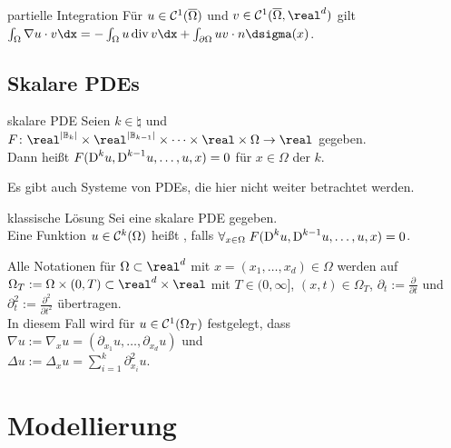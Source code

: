 \begin{Satz}{partielle Integration}
    Für $u \in \mathcal{C}^1(\overline{\Omega})$ und $v \in \C^1(\overline{\Omega}, \real^d)$ gilt\\
    $\int_\Omega \nabla u \cdot v \dx = -\int_\Omega u \div v \dx +
    \int_{\partial\Omega} uv \cdot n \dsigma(x)$.
\end{Satz}

\subsection{%
    Skalare PDEs%
}

\begin{Def}{skalare PDE}
    Seien $k \in \natural$ und
    $F\colon \real^{|\BB_k|} \times \real^{|\BB_{k-1}|} \times \dotsb
    \times \real \times \Omega \to \real$
    gegeben.\\
    Dann heißt $F(\text{D}^k u, \text{D}^{k-1} u, \dotsc, u, x) = 0$ für $x \in \Omega$
     der  $k$.
\end{Def}

\begin{Bem}
    Es gibt auch Systeme von PDEs, die hier nicht weiter betrachtet werden.
\end{Bem}

\begin{Def}{klassische Lösung}
    Sei eine skalare PDE gegeben.\\
    Eine Funktion $u \in \mathcal{C}^k(\Omega)$ heißt , falls
    $\forall_{x \in \Omega}\; F(\text{D}^k u, \text{D}^{k-1} u, \dotsc, u, x) = 0$.
\end{Def}

\begin{Bem}
    Alle Notationen für $\Omega \subset \real^d$ mit $x = (x_1, \dotsc, x_d) \in \Omega$ werden
    auf  $\Omega_T := \Omega \times (0, T) \subset \real^d \times \real$
    mit $T \in (0, \infty]$, $(x, t) \in \Omega_T$, $\partial_t := \frac{\partial}{\partial t}$
    und $\partial_t^2 := \frac{\partial^2}{\partial t^2}$ übertragen.\\
    In diesem Fall wird für $u \in \mathcal{C}^1(\Omega_T)$ festgelegt, dass
    $\nabla u := \nabla_x u = (\partial_{x_1} u, \dotsc, \partial_{x_d} u)$ und\\
    $\Delta u := \Delta_x u = \sum_{i=1}^k \partial_{x_i}^2 u$.
\end{Bem}

\pagebreak

\section{%
    Modellierung%
}

